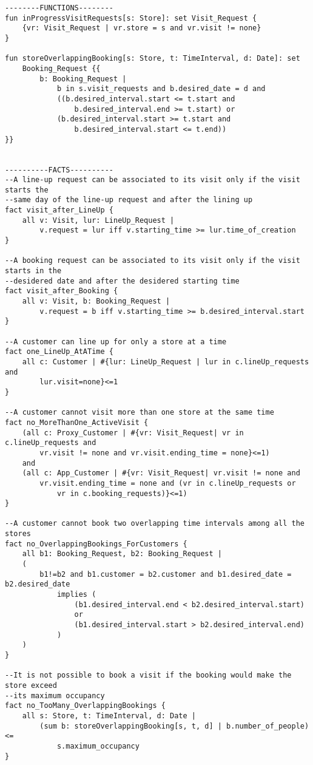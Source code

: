 \begin{lstlisting}[language=alloy]
--------FUNCTIONS--------
fun inProgressVisitRequests[s: Store]: set Visit_Request {
    {vr: Visit_Request | vr.store = s and vr.visit != none}
}

fun storeOverlappingBooking[s: Store, t: TimeInterval, d: Date]: set 
    Booking_Request {{
        b: Booking_Request |
            b in s.visit_requests and b.desired_date = d and
            ((b.desired_interval.start <= t.start and 
                b.desired_interval.end >= t.start) or
            (b.desired_interval.start >= t.start and 
                b.desired_interval.start <= t.end))
}}


----------FACTS----------
--A line-up request can be associated to its visit only if the visit starts the 
--same day of the line-up request and after the lining up
fact visit_after_LineUp {
    all v: Visit, lur: LineUp_Request | 
        v.request = lur iff v.starting_time >= lur.time_of_creation	 
}

--A booking request can be associated to its visit only if the visit starts in the
--desidered date and after the desidered starting time
fact visit_after_Booking {
    all v: Visit, b: Booking_Request | 
        v.request = b iff v.starting_time >= b.desired_interval.start 	 
}

--A customer can line up for only a store at a time
fact one_LineUp_AtATime {
    all c: Customer | #{lur: LineUp_Request | lur in c.lineUp_requests and 
        lur.visit=none}<=1
}

--A customer cannot visit more than one store at the same time
fact no_MoreThanOne_ActiveVisit {
    (all c: Proxy_Customer | #{vr: Visit_Request| vr in c.lineUp_requests and 
        vr.visit != none and vr.visit.ending_time = none}<=1)
    and
    (all c: App_Customer | #{vr: Visit_Request| vr.visit != none and
        vr.visit.ending_time = none and (vr in c.lineUp_requests or 
            vr in c.booking_requests)}<=1)
}

--A customer cannot book two overlapping time intervals among all the stores
fact no_OverlappingBookings_ForCustomers {
    all b1: Booking_Request, b2: Booking_Request |
    (
        b1!=b2 and b1.customer = b2.customer and b1.desired_date = b2.desired_date
            implies (
                (b1.desired_interval.end < b2.desired_interval.start)
                or
                (b1.desired_interval.start > b2.desired_interval.end)
            )
    )
}

--It is not possible to book a visit if the booking would make the store exceed
--its maximum occupancy
fact no_TooMany_OverlappingBookings {
    all s: Store, t: TimeInterval, d: Date |
        (sum b: storeOverlappingBooking[s, t, d] | b.number_of_people) <= 
            s.maximum_occupancy
}


\end{lstlisting}
